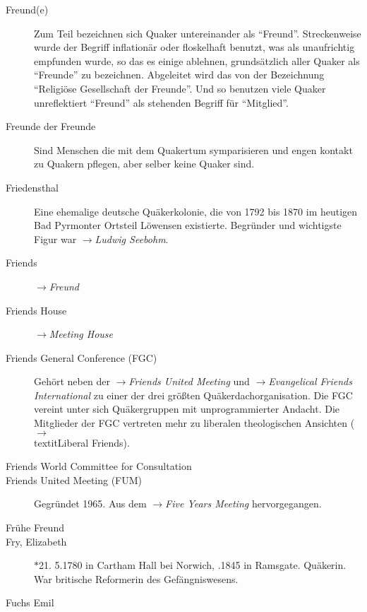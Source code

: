 \begin{description}
 \item[Freund(e)] Zum Teil bezeichnen sich Quaker untereinander als "`Freund"'. Streckenweise wurde der Begriff inflationär oder floskelhaft benutzt, was
 als unaufrichtig empfunden wurde, so das es einige ablehnen, grundsätzlich
 aller Quaker als "`Freunde"' zu bezeichnen. Abgeleitet wird das von der
 Bezeichnung "`Religiöse Gesellschaft der Freunde"'. Und so benutzen viele
 Quaker unreflektiert "`Freund"' als stehenden Begriff für "`Mitglied"'.
 
 \item[Freunde der Freunde] Sind Menschen die mit dem Quakertum symparisieren
 und engen kontakt zu Quakern pflegen, aber selber keine Quaker sind.

 \item[Friedensthal] Eine ehemalige deutsche Quäkerkolonie, die von 1792 bis
 1870 im heutigen Bad Pyrmonter Ortsteil Löwensen existierte. Begründer und
 wichtigste Figur war $\to$\textit{Ludwig Seebohm}.

 \item[Friends] $\to$\textit{Freund}

 \item[Friends House] $\to$\textit{Meeting House}

 \item[Friends General Conference (FGC)] Gehört neben der
 $\to$\textit{Friends United Meeting} und $\to$\textit{Evangelical Friends
 International} zu einer der drei größten Quäkerdachorganisation. Die FGC
 vereint unter sich Quäkergruppen mit unprogrammierter Andacht. Die Mitglieder
 der FGC vertreten mehr zu liberalen theologischen Ansichten
 ($\to$\\textit{Liberal Friends}). 



 \item[Friends World Committee for Consultation]

 \item[Friends United Meeting (FUM)] Gegründet 1965. Aus dem $\to$\textit{Five Years Meeting} hervorgegangen. 

 \item[Frühe Freund]

 \item[Fry, Elizabeth] $\ast$21. 5.1780 in Cartham Hall bei Norwich, .1845 in Ramsgate. Quäkerin. War britische Reformerin des Gefängniswesens.

 \item[Fuchs Emil]


 \end{description}

\normalsize